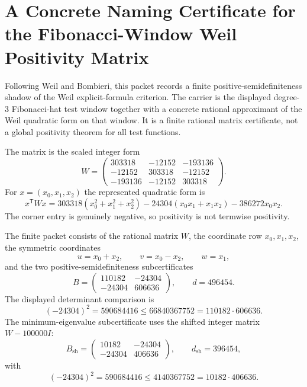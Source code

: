 \chapter{A Concrete Naming Certificate for the Fibonacci-Window Weil Positivity Matrix}
\label{ch:concrete-instances-fibonacci-window-weil-matrix-positivity-namecert}

Following Weil and Bombieri, this packet records a finite positive-semidefiniteness shadow of the Weil explicit-formula criterion. The carrier is the displayed degree-$3$ Fibonacci-hat test window together with a concrete rational approximant of the Weil quadratic form on that window. It is a finite rational matrix certificate, not a global positivity theorem for all test functions.

The matrix is the scaled integer form
$$
W=
\begin{pmatrix}
303318 & -12152 & -193136\\
-12152 & 303318 & -12152\\
-193136 & -12152 & 303318
\end{pmatrix}.
$$
For $x=(x_0,x_1,x_2)$ the represented quadratic form is
$$
x^{\mathsf T}Wx
=303318(x_0^2+x_1^2+x_2^2)
-24304(x_0x_1+x_1x_2)
-386272x_0x_2 .
$$
The corner entry is genuinely negative, so positivity is not termwise positivity.

\begin{definition}
\label{def:fibonacci-window-weil-matrix-packet}
The finite packet consists of the rational matrix $W$, the coordinate row $x_0,x_1,x_2$, the symmetric coordinates
$$
u=x_0+x_2,\qquad v=x_0-x_2,\qquad w=x_1,
$$
and the two positive-semidefiniteness subcertificates
$$
B=
\begin{pmatrix}
110182 & -24304\\
-24304 & 606636
\end{pmatrix},
\qquad
d=496454.
$$
The displayed determinant comparison is
$$
(-24304)^2=590684416
\leq 66840367752
=110182\cdot 606636.
$$
The minimum-eigenvalue subcertificate uses the shifted integer matrix $W-100000I$:
$$
B_{\mathrm{sh}}=
\begin{pmatrix}
10182 & -24304\\
-24304 & 406636
\end{pmatrix},
\qquad
d_{\mathrm{sh}}=396454,
$$
with
$$
(-24304)^2=590684416
\leq 4140367752
=10182\cdot 406636.
$$
\end{definition}

